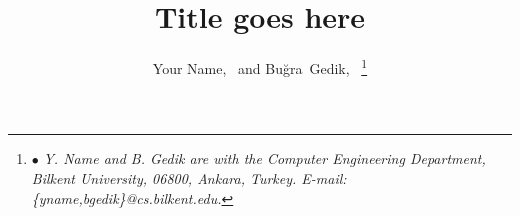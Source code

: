 



\title{Title goes here}

\author{Your Name,~ and Bu\u{g}ra~Gedik,~%
\thanks{$\bullet$ \emph{Y. Name and B. Gedik are with the Computer Engineering Department, 
                        Bilkent University, 06800, Ankara, Turkey. E-mail: \{yname,bgedik\}@cs.bilkent.edu. }}}

\IEEEcompsoctitleabstractindextext{}
\maketitle





 



